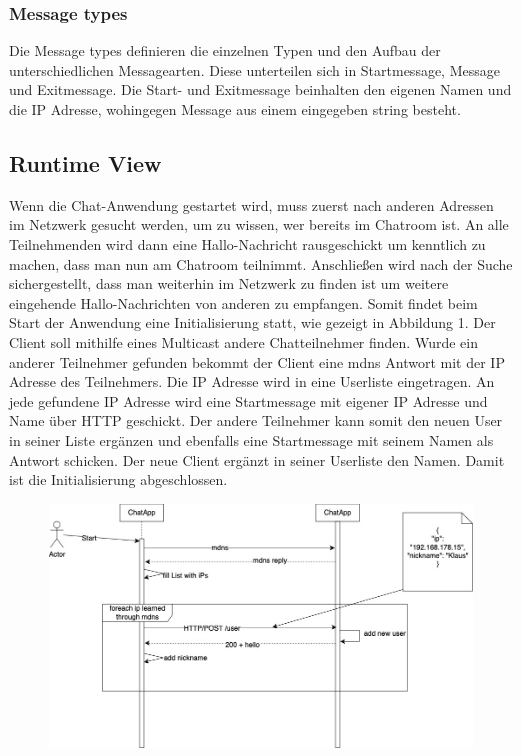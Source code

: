 \subsubsection{Message types}
Die Message types definieren die einzelnen Typen und den Aufbau der unterschiedlichen Messagearten. Diese unterteilen sich in Startmessage, Message und Exitmessage.
Die Start- und Exitmessage beinhalten den eigenen Namen und die IP Adresse, wohingegen Message aus einem eingegeben string besteht.
\subsection{Runtime View}
Wenn die Chat-Anwendung gestartet wird, muss zuerst nach anderen Adressen im Netzwerk gesucht werden, um zu wissen, wer bereits im Chatroom ist.
An alle Teilnehmenden wird dann eine Hallo-Nachricht rausgeschickt um kenntlich zu machen, dass man nun am Chatroom teilnimmt. 
Anschließen wird nach der Suche sichergestellt, dass man weiterhin im Netzwerk zu finden ist um weitere eingehende Hallo-Nachrichten von anderen zu empfangen. 
Somit findet beim Start der Anwendung eine Initialisierung statt, wie gezeigt in Abbildung 1.
Der Client soll mithilfe eines Multicast andere Chatteilnehmer finden.
Wurde ein anderer Teilnehmer gefunden bekommt der Client eine mdns Antwort mit der IP Adresse des Teilnehmers.
Die IP Adresse wird in eine Userliste eingetragen. 
An jede gefundene IP Adresse wird eine Startmessage mit eigener IP Adresse und Name über HTTP geschickt. Der andere Teilnehmer kann somit den neuen 
User in seiner Liste ergänzen und ebenfalls eine Startmessage mit seinem Namen als Antwort schicken. Der neue Client ergänzt in seiner Userliste 
den Namen. Damit ist die Initialisierung abgeschlossen. 
\begin{figure}[h]
    \centering
    \includegraphics[scale=0.4]{Images/Initialisierung_Sequenzdiagramm.jpg}
\end{figure} 
